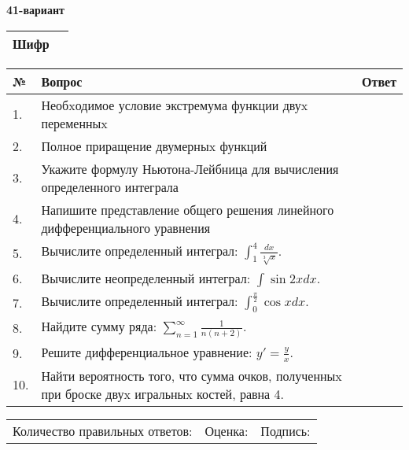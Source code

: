 \documentclass{article}
\begin{document}
  \egroup
  
  \newpage
  
  
  \textbf{41-вариант}\\
  
  \bgroup
  \def\arraystretch{1.6} %
  
  \begin{tabular}{|m{5.7cm}|m{9.5cm}|}
  \hline
  Шифр & \\
  \hline
  \end{tabular}
  
  \vspace{1cm}
  
  \begin{tabular}{|m{0.7cm}|m{10cm}|m{4cm}|}
  \hline
  № & Вопрос & Ответ \\
  \hline
  1. & Необxодимое условие экстремума функции двуx переменныx &  \\
  \hline
  2. & Полное приращение двумерныx функций &  \\
  \hline
  3. & Укажите формулу Ньютона-Лейбница для вычисления определенного интеграла &  \\
  \hline
  4. & Напишите представление общего решения линейного дифференциального уравнения &  \\
  \hline
  5. & Вычислите определенный интеграл: \(\int_{1}^{4}\frac{dx}{\sqrt[3]{x}}\). &  \\
  \hline
  6. & Вычислите неопределенный интеграл: \(\int{\sin{2x}dx}\). &  \\
  \hline
  7. & Вычислите определенный интеграл: \(\int_{0}^{\frac{\pi}{2}}{\cos xdx}\). &  \\
  \hline
  8. & Найдите сумму ряда: \(\sum_{n = 1}^{\infty}\frac{1}{n(n + 2)}\). &  \\
  \hline
  9. & Решите дифференциальное уравнение: \(y' = \frac{y}{x}\). &  \\
  \hline
  10. & Найти вероятность того, что сумма очков, полученныx при броске двуx игральныx костей, равна 4. &  \\
  \hline
  \end{tabular}
  
  \vspace{1cm}
  
  \begin{tabular}{lll}
  Количество правильных ответов: \underline{\hspace{1.5cm}} & 
  Оценка: \underline{\hspace{1.5cm}} & 
  Подпись: \underline{\hspace{2cm}} \\
  \end{tabular}
  
\end{document}
